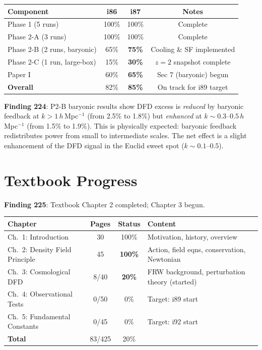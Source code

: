 \documentclass[11pt,a4paper]{article}
\begin{document}
\begin{center}
\begin{tabular}{lccc}
\toprule
\textbf{Component} & \textbf{i86} & \textbf{i87} & \textbf{Notes} \\
\midrule
Phase 1 (5 runs) & 100\% & 100\% & Complete \\
Phase 2-A (3 runs) & 100\% & 100\% & Complete \\
Phase 2-B (2 runs, baryonic) & 65\% & \textbf{75\%} & Cooling \& SF implemented \\
Phase 2-C (1 run, large-box) & 15\% & \textbf{30\%} & $z = 2$ snapshot complete \\
Paper I & 60\% & \textbf{65\%} & Sec 7 (baryonic) begun \\
\midrule
\textbf{Overall} & 82\% & \textbf{85\%} & On track for i89 target \\
\bottomrule
\end{tabular}
\end{center}

\textbf{Finding 224}: P2-B baryonic results show DFD excess is \emph{reduced} by baryonic feedback at $k > 1\,h\,$Mpc$^{-1}$ (from 2.5\% to 1.8\%) but \emph{enhanced} at $k \sim 0.3$--$0.5\,h\,$Mpc$^{-1}$ (from 1.5\% to 1.9\%). This is physically expected: baryonic feedback redistributes power from small to intermediate scales. The net effect is a slight enhancement of the DFD signal in the Euclid sweet spot ($k \sim 0.1$--$0.5$).

\section{Textbook Progress}

\textbf{Finding 225}: Textbook Chapter 2 completed; Chapter 3 begun.

\begin{center}
\begin{tabular}{lccl}
\toprule
\textbf{Chapter} & \textbf{Pages} & \textbf{Status} & \textbf{Content} \\
\midrule
Ch.\ 1: Introduction & 30 & 100\% & Motivation, history, overview \\
Ch.\ 2: Density Field Principle & 45 & \textbf{100\%} & Action, field eqns, conservation, Newtonian \\
Ch.\ 3: Cosmological DFD & 8/40 & \textbf{20\%} & FRW background, perturbation theory (started) \\
Ch.\ 4: Observational Tests & 0/50 & 0\% & Target: i89 start \\
Ch.\ 5: Fundamental Constants & 0/45 & 0\% & Target: i92 start \\
\midrule
\textbf{Total} & 83/425 & 20\% & \\
\bottomrule
\end{tabular}
\end{center}
\end{document}
